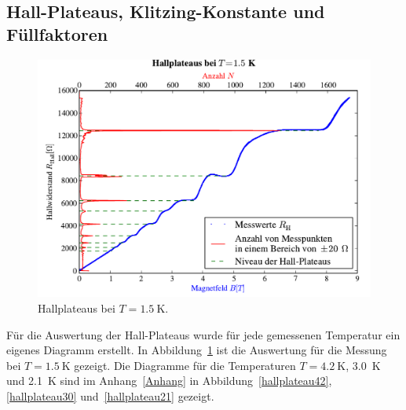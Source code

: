 \documentclass[paper=a4,fontsize=10pt,DIV=18,twocolumn,parskip=half]{scrartcl}
\numberwithin{equation}{section}    %
\begin{document}
% 
~~~~~~~~~~~~~~~~~~~~~~~~~~~~~~~~~~~~~~~~~~~~~~~~~~~~~~~~~~~~~~~~~~~~~~~~~~~~~
\subsection{Hall-Plateaus, Klitzing-Konstante und Füllfaktoren}
\label{a1}

\begin{figure}[htp]
	\begin{center}
		\includegraphics[width=\columnwidth]{Data-Plots/05-1,5-Hallplateaus.pdf}
		\caption{Hallplateaus bei $T=\SI{1.5}{\kelvin}$.}
		\label{hallplateau}
	\end{center}
\end{figure}

Für die Auswertung der Hall-Plateaus wurde für jede gemessenen Temperatur ein eigenes Diagramm erstellt. In Abbildung~\ref{hallplateau} ist die Auswertung für die Messung bei $T=\SI{1.5}{\kelvin}$ gezeigt. Die Diagramme für die Temperaturen $T = \SI{4.2}{\kelvin}$, \SI{3.0}{\kelvin} und \SI{2.1}{\kelvin} sind im Anhang~\ref{Anhang} in Abbildung~\ref{hallplateau42}, \ref{hallplateau30} und~\ref{hallplateau21} gezeigt.
\end{document}
